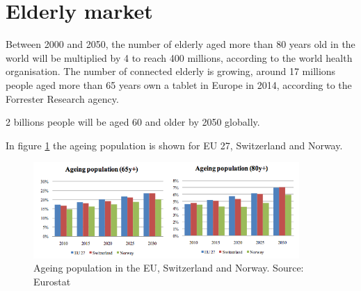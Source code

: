 \section{Elderly market}

Between 2000 and 2050, the number of elderly aged more than 80 years old in the world will be multiplied by 4 to reach 400 millions, according to the world health organisation. The number of connected elderly is growing, around 17 millions people aged more than 65 years own a tablet in Europe in 2014, according to the Forrester Research agency.

2 billions people will be aged 60 and older by 2050 globally.

In figure \ref{fig:population} the ageing population is shown for EU 27, Switzerland and Norway.
\begin{figure}[!htb]
    \centering
    \includegraphics[width=0.9\textwidth,keepaspectratio]{chap/marketFig/population.png}
    \caption{Ageing population in the EU, Switzerland and Norway. Source: Eurostat}
    \label{fig:population}
\end{figure}
